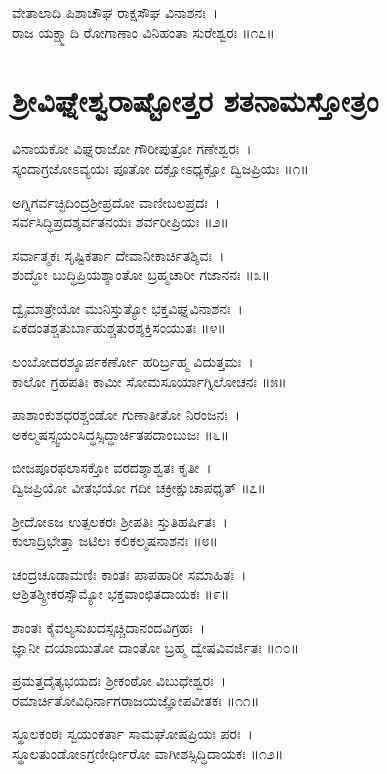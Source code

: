 ವೇತಾಲಾದಿ ಪಿಶಾಚೌಘ ರಾಕ್ಷಸೌಘ ವಿನಾಶನಃ~।\\
ರಾಜ ಯಕ್ಷ್ಮಾದಿ ರೋಗಾಣಾಂ ವಿನಿಹಂತಾ ಸುರೇಶ್ವರಃ ॥೧೭॥
\section{ಶ್ರೀವಿಘ್ನೇಶ್ವರಾಷ್ಟೋತ್ತರ ಶತನಾಮಸ್ತೋತ್ರಂ}
  
ವಿನಾಯಕೋ ವಿಘ್ನರಾಜೋ ಗೌರೀಪುತ್ರೋ ಗಣೇಶ್ವರಃ~।\\
ಸ್ಕಂದಾಗ್ರಜೋಽವ್ಯಯಃ ಪೂತೋ ದಕ್ಷೋಽಧ್ಯಕ್ಷೋ ದ್ವಿಜಪ್ರಿಯಃ ॥೧॥

ಅಗ್ನಿಗರ್ವಚ್ಛಿದಿಂದ್ರಶ್ರೀಪ್ರದೋ ವಾಣೀಬಲಪ್ರದಃ~।\\
ಸರ್ವಸಿದ್ಧಿಪ್ರದಶ್ಶರ್ವತನಯಃ ಶರ್ವರೀಪ್ರಿಯಃ ॥೨॥

ಸರ್ವಾತ್ಮಕಃ ಸೃಷ್ಟಿಕರ್ತಾ ದೇವಾನೀಕಾರ್ಚಿತಶ್ಶಿವಃ~।\\
ಶುದ್ಧೋ ಬುದ್ಧಿಪ್ರಿಯಶ್ಶಾಂತೋ ಬ್ರಹ್ಮಚಾರೀ ಗಜಾನನಃ ॥೩॥

ದ್ವೈಮಾತ್ರೇಯೋ ಮುನಿಸ್ತುತ್ಯೋ ಭಕ್ತವಿಘ್ನವಿನಾಶನಃ~।\\
ಏಕದಂತಶ್ಚತುರ್ಬಾಹುಶ್ಚತುರಶ್ಶಕ್ತಿಸಂಯುತಃ ॥೪॥

ಲಂಬೋದರಶ್ಶೂರ್ಪಕರ್ಣೋ ಹರಿರ್ಬ್ರಹ್ಮ ವಿದುತ್ತಮಃ~।\\
ಕಾಲೋ ಗ್ರಹಪತಿಃ ಕಾಮೀ ಸೋಮಸೂರ್ಯಾಗ್ನಿಲೋಚನಃ ॥೫॥

ಪಾಶಾಂಕುಶಧರಶ್ಚಂಡೋ ಗುಣಾತೀತೋ ನಿರಂಜನಃ~।\\
ಅಕಲ್ಮಷಸ್ಸ್ವಯಂಸಿದ್ಧಸ್ಸಿದ್ಧಾರ್ಚಿತಪದಾಂಬುಜಃ ॥೬॥

ಬೀಜಪೂರಫಲಾಸಕ್ತೋ ವರದಶ್ಶಾಶ್ವತಃ ಕೃತೀ~।\\
ದ್ವಿಜಪ್ರಿಯೋ ವೀತಭಯೋ ಗದೀ ಚಕ್ರೀಕ್ಷುಚಾಪಧೃತ್ ॥೭॥

ಶ್ರೀದೋಽಜ ಉತ್ಪಲಕರಃ ಶ್ರೀಪತಿಃ ಸ್ತುತಿಹರ್ಷಿತಃ~।\\
ಕುಲಾದ್ರಿಭೇತ್ತಾ ಜಟಿಲಃ ಕಲಿಕಲ್ಮಷನಾಶನಃ ॥೮॥

ಚಂದ್ರಚೂಡಾಮಣಿಃ ಕಾಂತಃ ಪಾಪಹಾರೀ ಸಮಾಹಿತಃ~।\\
ಆಶ್ರಿತಶ್ಶ್ರೀಕರಸ್ಸೌಮ್ಯೋ ಭಕ್ತವಾಂಛಿತದಾಯಕಃ ॥೯॥

ಶಾಂತಃ ಕೈವಲ್ಯಸುಖದಸ್ಸಚ್ಚಿದಾನಂದವಿಗ್ರಹಃ~।\\
ಜ್ಞಾನೀ ದಯಾಯುತೋ ದಾಂತೋ ಬ್ರಹ್ಮ ದ್ವೇಷವಿವರ್ಜಿತಃ ॥೧೦॥

ಪ್ರಮತ್ತದೈತ್ಯಭಯದಃ ಶ್ರೀಕಂಠೋ ವಿಬುಧೇಶ್ವರಃ~।\\
ರಮಾರ್ಚಿತೋವಿಧಿರ್ನಾಗರಾಜಯಜ್ಞೋಪವೀತಕಃ ॥೧೧॥

ಸ್ಥೂಲಕಂಠಃ ಸ್ವಯಂಕರ್ತಾ ಸಾಮಘೋಷಪ್ರಿಯಃ ಪರಃ~।\\
ಸ್ಥೂಲತುಂಡೋಽಗ್ರಣೀರ್ಧೀರೋ ವಾಗೀಶಸ್ಸಿದ್ಧಿದಾಯಕಃ ॥೧೨॥

